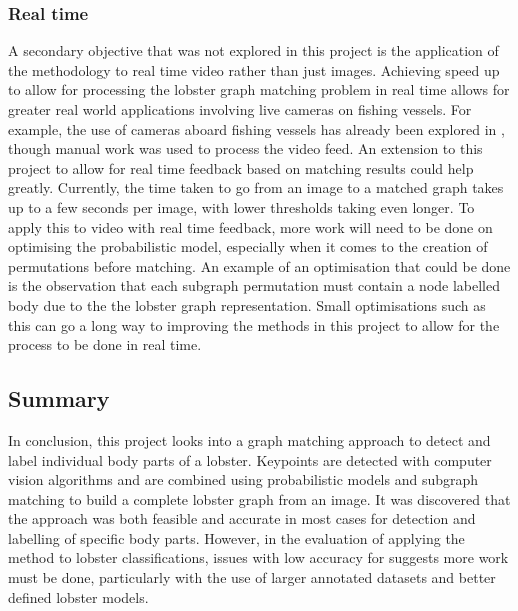 \subsubsection{Real time}
A secondary objective that was not explored in this project is the application of the methodology to real time video rather than just images. Achieving speed up to allow for processing the lobster graph matching problem in real time allows for greater real world applications involving live cameras on fishing vessels. For example, the use of cameras aboard fishing vessels has already been explored in \cite{lobster-video}, though manual work was used to process the video feed. An extension to this project to allow for real time feedback based on matching results could help greatly. Currently, the time taken to go from an image to a matched graph takes up to a few seconds per image, with lower thresholds taking even longer. To apply this to video with real time feedback, more work will need to be done on optimising the probabilistic model, especially when it comes to the creation of permutations before matching. An example of an optimisation that could be done is the observation that each subgraph permutation must contain a node labelled body due to the the lobster graph representation. Small optimisations such as this can go a long way to improving the methods in this project to allow for the process to be done in real time. 

\subsection{Summary}
In conclusion, this project looks into a graph matching approach to detect and label individual body parts of a lobster. Keypoints are detected with computer vision algorithms and are combined using probabilistic models and subgraph matching to build a complete lobster graph from an image. It was discovered that the approach was both feasible and accurate in most cases for detection and labelling of specific body parts. However, in the evaluation of applying the method to lobster classifications, issues with low accuracy for suggests more work must be done, particularly with the use of larger annotated datasets and better defined lobster models.

